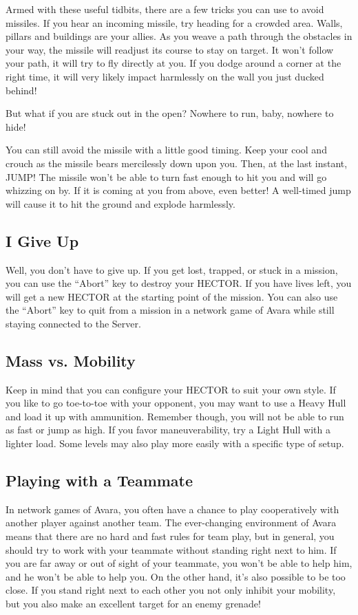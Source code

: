 \documentclass{article}
\begin{document}
Armed with these useful tidbits, there are a few tricks you can use to avoid missiles. If you hear an incoming missile, try heading for a crowded area. Walls, pillars and buildings are your allies. As you weave a path through the obstacles in your way, the missile will readjust its course to stay on target. It won't follow your path, it will try to fly directly at you. If you dodge around a corner at the right time, it will very likely impact harmlessly on the wall you just ducked behind!

But what if you are stuck out in the open? Nowhere to run, baby, nowhere to hide!

You can still avoid the missile with a little good timing. Keep your cool and crouch as the missile bears mercilessly down upon you. Then, at the last instant, JUMP! The missile won't be able to turn fast enough to hit you and will go whizzing on by. If it is coming at you from above, even better! A well-timed jump will cause it to hit the ground and explode harmlessly.

\subsection{I Give Up}
Well, you don't have to give up. If you get lost, trapped, or stuck in a mission, you can use the ``Abort'' key to destroy your HECTOR. If you have lives left, you will get a new HECTOR at the starting point of the mission. You can also use the ``Abort'' key to quit from a mission in a network game of Avara while still staying connected to the Server.

\subsection{Mass vs. Mobility}
Keep in mind that you can configure your HECTOR to suit your own style. If you like to go toe-to-toe with your opponent, you may want to use a Heavy Hull and load it up with ammunition. Remember though, you will not be able to run as fast or jump as high. If you favor maneuverability, try a Light Hull with a lighter load. Some levels may also play more easily with a specific type of setup.

\subsection{Playing with a Teammate}
In network games of Avara, you often have a chance to play cooperatively with another player against another team. The ever-changing environment of Avara means that there are no hard and fast rules for team play, but in general, you should try to work with your teammate without standing right next to him. If you are far away or out of sight of your teammate, you won't be able to help him, and he won't be able to help you. On the other hand, it's also possible to be too close. If you stand right next to each other you not only inhibit your mobility, but you also make an excellent target for an enemy grenade!
\end{document}

